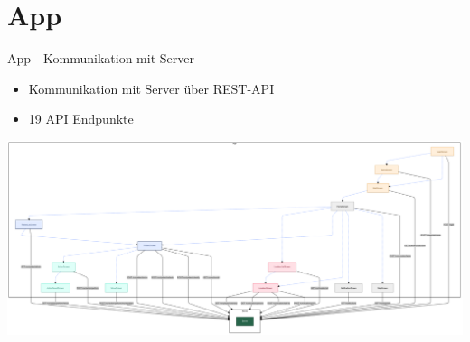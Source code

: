 %
%
\section{App}

\begin{frame}{App - Kommunikation mit Server}
	\begin{itemize}
		\item Kommunikation mit Server über REST-API
		\item 19 API Endpunkte
	\end{itemize}
	\centering
	\includegraphics[width=1.0\textwidth]{images/app/server_endpoints.png}
\end{frame}
